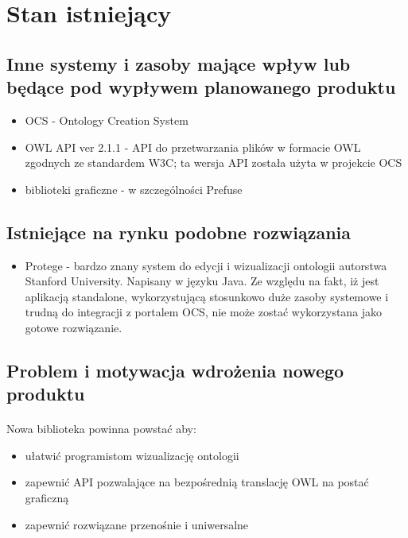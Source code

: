\documentclass[a4paper,10pt]{article}
\begin{document}
\section{Stan istniejący}

\subsection{Inne systemy i zasoby mające wpływ lub będące pod wypływem planowanego produktu}

\begin{itemize}
 	\item OCS - Ontology Creation System
	\item OWL API ver 2.1.1 - API do przetwarzania plików w formacie OWL zgodnych ze standardem W3C; ta wersja API została użyta w projekcie OCS
	\item biblioteki graficzne - w szczególności Prefuse
\end{itemize}


\subsection{Istniejące na rynku podobne rozwiązania}

\begin{itemize}
 \item Protege - bardzo znany system do edycji i wizualizacji ontologii autorstwa Stanford University. Napisany w języku Java. Ze względu na fakt, iż jest aplikacją standalone, wykorzystującą stosunkowo duże zasoby systemowe i trudną do integracji z portalem OCS, nie może zostać wykorzystana jako gotowe rozwiązanie.

\end{itemize}

\subsection{Problem i motywacja wdrożenia nowego produktu}
\paragraph{} Nowa biblioteka powinna powstać aby:
\begin{itemize}
 \item ułatwić programistom wizualizację ontologii
\item zapewnić API pozwalające na bezpośrednią translację OWL na postać graficzną
\item zapewnić rozwiązane przenośnie i uniwersalne
\end{itemize}
\end{document}
